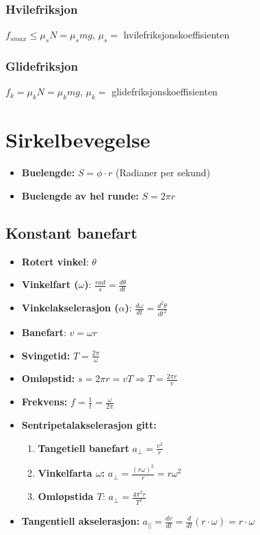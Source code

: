 \documentclass[12pt]{article}
\begin{document}
\subsubsection{Hvilefriksjon}
$f_{s max} \leq \mu_sN = \mu_smg$, $\mu_s =$ hvilefriksjonskoeffisienten
\subsubsection{Glidefriksjon}
$f_k = \mu_kN = \mu_kmg$, $\mu_k =$ glidefriksjonskoeffisienten
%
%
\section{Sirkelbevegelse}
\begin{itemize}
    \item[] \textbf{Buelengde: } $S = \phi \cdot r$ (Radianer per sekund)
    \item[] \textbf{Buelengde av hel runde:} $S = 2\pi r$
    \
\end{itemize}

\subsection{Konstant banefart}
\begin{itemize}
    \item[] \textbf{Rotert vinkel}: $\theta$
    \item[] \textbf{Vinkelfart ($\omega$)}: $\frac{rad}{s} = \frac{d\theta}{dt}$
    \item[] \textbf{Vinkelakselerasjon ($\alpha$)}: $\frac{d\omega}{dt} = \frac{d^2\theta}{dt^2}$
    \item[] \textbf{Banefart}: $v = \omega r$
    \item[] \textbf{Svingetid:} $T = \frac{2\pi}{\omega}$
    \item[] \textbf{Omløpstid:} $s = 2\pi r = vT \Rightarrow T = \frac{2\pi r}{v}$
    \item[] \textbf{Frekvens:} $f = \frac{1}{t} = \frac{\omega}{2\pi} $
    \item[] \textbf{Sentripetalakselerasjon gitt:}
    \begin{enumerate}
        \item \textbf{Tangetiell banefart} $a_\bot = \frac{v^2}{r}$
        \item \textbf{Vinkelfarta $\omega$:} $a_\bot = \frac{(r\omega)^2}{r} = r\omega^2 $
        \item \textbf{Omløpstida $T$}: $a_\bot = \frac{4\pi^2r}{T^2}$
    \end{enumerate}
    \item[] \textbf{Tangentiell akselerasjon:} $a_{||} = \frac{dv}{dt} = \frac{d}{dt}(r\cdot \omega) = r\cdot \omega$
\end{itemize}
\pagebreak
\end{document}

